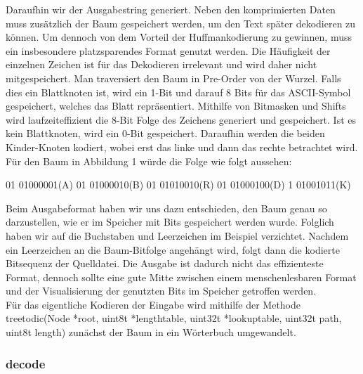 \documentclass[course=erap]{aspdoc}
\begin{document}
Daraufhin wir der Ausgabestring generiert. Neben den komprimierten Daten muss zusätzlich der Baum gespeichert werden, um den Text später dekodieren zu können. Um dennoch von dem Vorteil der Huffmankodierung zu gewinnen, muss ein insbesondere platzsparendes Format genutzt werden. Die Häufigkeit der einzelnen Zeichen ist für das Dekodieren irrelevant und wird daher nicht mitgespeichert.
Man traversiert den Baum in Pre-Order von der Wurzel. Falls dies ein Blattknoten ist, wird ein 1-Bit und darauf 8 Bits für das ASCII-Symbol gespeichert, welches das Blatt repräsentiert. Mithilfe von Bitmasken und Shifts wird laufzeiteffizient die 8-Bit Folge des Zeichens generiert und gespeichert. Ist es kein Blattknoten, wird ein 0-Bit gespeichert. Daraufhin werden die beiden Kinder-Knoten kodiert, wobei erst das linke und dann das rechte betrachtet wird.
Für den Baum in Abbildung 1 würde die Folge wie folgt aussehen:

\begin{center}
    01 01000001(A) 01 01000010(B) 01 01010010(R) 01 01000100(D) 1 01001011(K)
\end{center}
Beim Ausgabeformat haben wir uns dazu entschieden, den Baum genau so darzustellen, wie er im Speicher mit Bits gespeichert werden wurde. Folglich haben wir auf die Buchstaben und Leerzeichen im Beispiel verzichtet. Nachdem ein Leerzeichen an die Baum-Bitfolge angehängt wird, folgt dann die kodierte Bitsequenz der Quelldatei. Die Ausgabe ist dadurch nicht das effizienteste Format, dennoch sollte eine gute Mitte zwischen einem menschenlesbaren Format und der Visualisierung der genutzten Bits im Speicher getroffen werden.\\
Für das eigentliche Kodieren der Eingabe wird mithilfe der Methode tree\textunderscore to\textunderscore dic(Node *root, uint8\textunderscore t *length\textunderscore table, uint32\textunderscore t *lookup\textunderscore table, uint32\textunderscore t path, uint8\textunderscore t length) zunächst der Baum in ein Wörterbuch umgewandelt.



\subsubsection{decode}
\end{document}
